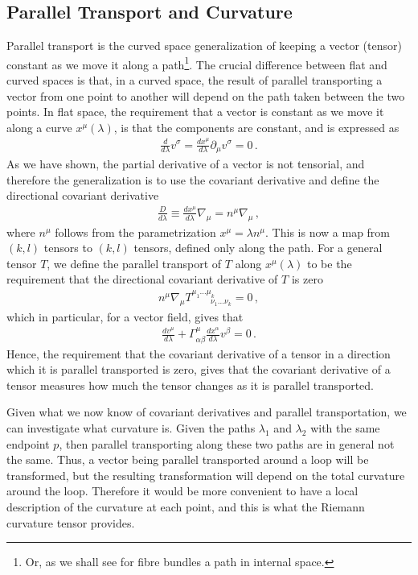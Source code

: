 \subsection*{Parallel Transport and Curvature}
Parallel transport is the curved space generalization of keeping a vector (tensor) constant as we move it along a path\footnote{Or, as we shall see for fibre bundles a path in internal space.}. The crucial difference between flat and curved spaces is that, in a curved space, the result of parallel transporting a vector from one point to another will depend on the path taken between the two points. In flat space, the requirement that a vector is constant as we move it along a curve $x^{\mu}(\lambda)$, is that the components are constant, and is expressed as
\begin{align}
    \frac{d}{d\lambda}v^{\sigma}=\frac{dx^{\mu}}{d\lambda}\partial_{\mu}v^{\sigma}=0\,.
\end{align}
As we have shown, the partial derivative of a vector is not tensorial, and therefore the generalization is to use the covariant derivative and define the directional covariant derivative
\begin{align}
    \frac{D}{d\lambda}\equiv \frac{dx^{\mu}}{d\lambda}\nabla_{\mu}=n^{\mu}\nabla_{\mu}\,,
\end{align}
where $n^{\mu}$ follows from the parametrization $x^{\mu}=\lambda n^{\mu}$. This is now a map from $(k,l)$ tensors to $(k,l)$ tensors, defined only along the path. For a general tensor $T$, we define the parallel transport of $T$ along $x^{\mu}(\lambda)$ to be the requirement that the directional covariant derivative of $T$ is zero
\begin{align}
    n^{\mu}\nabla_{\mu}T^{\mu_{1}\dots\mu_{k}}_{\hspace{1cm}\nu_{1}\dots\nu_{k}}=0\,,
\end{align}
which in particular, for a vector field, gives that
\begin{align}
    \frac{dv^{\mu}}{d\lambda}+\Gamma^{\mu}_{\alpha\beta}\frac{dx^{\alpha}}{d\lambda}v^{\beta}=0\,.
\end{align}
Hence, the requirement that the covariant derivative of a tensor in a direction which it is parallel transported is zero, gives that the covariant derivative of a tensor measures how much the tensor changes as it is parallel transported.

\medskip
Given what we now know of covariant derivatives and parallel transportation, we can investigate what curvature is. Given the paths $\lambda_{1}$ and $\lambda_{2}$ with the same endpoint $p$, then parallel transporting along these two paths are in general not the same. Thus, a vector being parallel transported around a loop will be transformed, but the resulting transformation will depend on the total curvature around the loop. Therefore it would be more convenient to have a local description of the curvature at each point, and this is what the Riemann curvature tensor provides.

